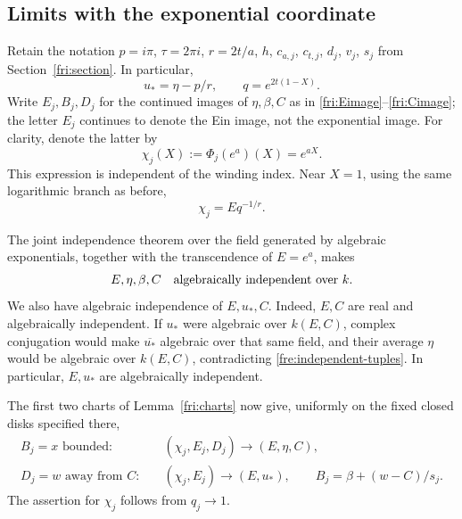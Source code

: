 \documentclass[11pt]{article}
\theoremstyle{definition}
\theoremstyle{remark}
\begin{document}
\subsection{Limits with the exponential coordinate}

Retain the notation $p=i\pi$, $\tau=2\pi i$, $r=2t/a$, $h$,
$c_{a,j}$, $c_{t,j}$, $d_j$, $v_j$, $s_j$ from
Section~\ref{fri:section}.  In particular,
\[
 u_* = \eta-p/r,\qquad q=e^{2t(1-X)}.
\]
Write $E_j,B_j,D_j$ for the continued images of $\eta,\beta,C$
as in \eqref{fri:Eimage}--\eqref{fri:Cimage}; the letter $E_j$
continues to denote the Ein image, not the exponential image.
For clarity, denote the latter by
\begin{equation}\label{fre:exponential-image}
 \chi_j(X):=\Phi_j(e^a)(X)=e^{aX}.
\end{equation}
This expression is independent of the winding index.  Near $X=1$,
using the same logarithmic branch as before,
\begin{equation}\label{fre:exponential-q}
 \chi_j=E q^{-1/r}.
\end{equation}

The joint independence theorem over the field generated by algebraic
exponentials, together with the transcendence of $E=e^a$, makes
\begin{equation}\label{fre:independent-tuples}
 E,\eta,\beta,C
 \quad\hbox{algebraically independent over }k.
\end{equation}
We also have algebraic independence of $E,u_*,C$.  Indeed, $E,C$
are real and algebraically independent.  If $u_*$ were algebraic
over $k(E,C)$, complex conjugation would make $\overline{u_*}$
algebraic over that same field, and their average $\eta$ would be
algebraic over $k(E,C)$, contradicting
\eqref{fre:independent-tuples}.  In particular, $E,u_*$ are
algebraically independent.

The first two charts of Lemma~\ref{fri:charts} now give, uniformly
on the fixed closed disks specified there,
\begin{align}
 B_j=x\text{ bounded}:\quad
   &(\chi_j,E_j,D_j)\longrightarrow(E,\eta,C),
     \label{fre:beta-limit}\\
 D_j=w\text{ away from }C:\quad
   &(\chi_j,E_j)\longrightarrow(E,u_*),
   \qquad B_j=\beta+(w-C)/s_j.
     \label{fre:C-limit}
\end{align}
The assertion for $\chi_j$ follows from $q_j\to1$.
\end{document}
